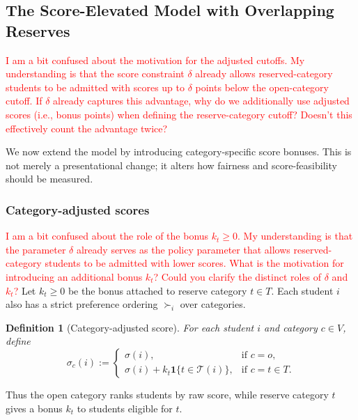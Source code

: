 \documentclass[12pt]{article}
\newtheorem{definition}{Definition}
\newcommand{\T}{\mathcal{T}}
\newcommand{\1}{\mathbf{1}}
\begin{document}
\subsection{The Score-Elevated Model with Overlapping Reserves}
\textcolor{red}{I am a bit confused about the motivation for the adjusted cutoffs. My understanding is that the score constraint $\delta$ already allows reserved-category students to be admitted with scores up to $\delta$ points below the open-category cutoff. If $\delta$  already captures this advantage, why do we additionally use adjusted scores (i.e., bonus points) when defining the reserve-category cutoff? Doesn’t this effectively count the advantage twice?}

We now extend the model by introducing category-specific score bonuses. This is not merely a presentational change; it alters how fairness and score-feasibility should be measured.

\subsubsection{Category-adjusted scores}
\textcolor{red}{I am a bit confused about the role of the bonus $k_t \ge 0$. My understanding is that the parameter $\delta$ already serves as the policy parameter that allows reserved-category students to be admitted with lower scores. What is the motivation for introducing an additional bonus $k_t$? Could you clarify the distinct roles of $\delta$ and $k_t$?}
Let $k_t\ge 0$ be the bonus attached to reserve category $t\in T$. Each student $i$ also has a strict preference ordering $\succ_i$ over categories.

\begin{definition}[Category-adjusted score]
For each student $i$ and category $c\in V$, define
\[
\sigma_c(i):=
\begin{cases}
\sigma(i), & \text{if } c=o,\\[4pt]
\sigma(i)+k_t\1\{t\in\T(i)\}, & \text{if } c=t\in T.
\end{cases}
\]
\end{definition}

Thus the open category ranks students by raw score, while reserve category $t$ gives a bonus $k_t$ to students eligible for $t$.

\end{document}
